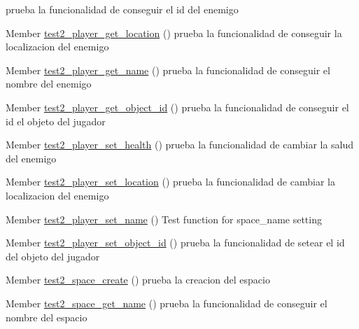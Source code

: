 \begin{DoxyRefList}
%
prueba la funcionalidad de conseguir el id del enemigo  
\item[Member \mbox{\hyperlink{player__test_8h_a4c5605fac4bd716e1dfb2744db4fa8a1}{test2\+\_\+player\+\_\+get\+\_\+location}} ()]\label{test__test000042}%
%
prueba la funcionalidad de conseguir la localizacion del enemigo  
\item[Member \mbox{\hyperlink{player__test_8h_a3aa908fd360b74e7786422260e8e16a0}{test2\+\_\+player\+\_\+get\+\_\+name}} ()]\label{test__test000035}%
%
prueba la funcionalidad de conseguir el nombre del enemigo  
\item[Member \mbox{\hyperlink{player__test_8h_ae2b63c5d260f0afc2acf9ef993e754f8}{test2\+\_\+player\+\_\+get\+\_\+object\+\_\+id}} ()]\label{test__test000052}%
%
prueba la funcionalidad de conseguir el id el objeto del jugador  
\item[Member \mbox{\hyperlink{player__test_8h_aca602481af023c45a1fe6825860aa184}{test2\+\_\+player\+\_\+set\+\_\+health}} ()]\label{test__test000046}%
%
prueba la funcionalidad de cambiar la salud del enemigo  
\item[Member \mbox{\hyperlink{player__test_8h_a2c702753d9e2e3df9ef4abf2d1b9bc8d}{test2\+\_\+player\+\_\+set\+\_\+location}} ()]\label{test__test000039}%
%
prueba la funcionalidad de cambiar la localizacion del enemigo  
\item[Member \mbox{\hyperlink{player__test_8h_a6e7ce8ff791f4bf63749df647a44263f}{test2\+\_\+player\+\_\+set\+\_\+name}} ()]\label{test__test000032}%
%
Test function for space\+\_\+name setting  
\item[Member \mbox{\hyperlink{player__test_8h_ae1003c8e6a6f897c1abc0860fab29c77}{test2\+\_\+player\+\_\+set\+\_\+object\+\_\+id}} ()]\label{test__test000049}%
%
prueba la funcionalidad de setear el id del objeto del jugador  
\item[Member \mbox{\hyperlink{space__test_8h_a012cd3cf37a8d91e2d7098a264c29d65}{test2\+\_\+space\+\_\+create}} ()]\label{test__test000054}%
%
prueba la creacion del espacio  
\item[Member \mbox{\hyperlink{space__test_8h_aee88ed31c63efc674051a4563aed86e2}{test2\+\_\+space\+\_\+get\+\_\+name}} ()]\label{test__test000059}%
%
prueba la funcionalidad de conseguir el nombre del espacio  

\end{DoxyRefList}
